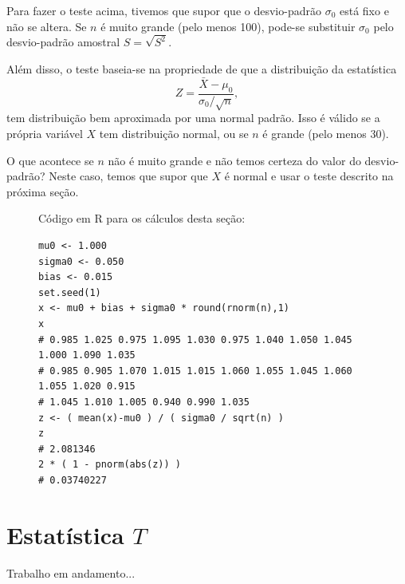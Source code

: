 \documentclass[12pt,a4paper]{article}
\theoremstyle{plain}
\theoremstyle{definition}
\theoremstyle{remark}
\begin{document}
Para fazer o teste acima, tivemos que supor que o desvio-padrão $\sigma_0$ está fixo e não se altera.
Se $n$ é muito grande (pelo menos 100), pode-se substituir $\sigma_0$ pelo desvio-padrão amostral $S = \sqrt{S^2}$.

Além disso, o teste baseia-se na propriedade de que a distribuição da estatística
\[
Z = \frac{\bar X - \mu_0}{\sigma_0 / \sqrt{n}}
,
\]
tem distribuição bem aproximada por uma normal padrão.
Isso é válido se a própria variável $X$ tem distribuição normal, ou se $n$ é grande (pelo menos 30).

O que acontece se $n$ não é muito grande e não temos certeza do valor do desvio-padrão?
Neste caso, temos que supor que $X$ é normal e usar o teste descrito na próxima seção.

\begin{figure}[H]
Código em R para os cálculos desta seção:
\footnotesize
\begin{verbatim}
mu0 <- 1.000
sigma0 <- 0.050
bias <- 0.015
set.seed(1)
x <- mu0 + bias + sigma0 * round(rnorm(n),1)
x
# 0.985 1.025 0.975 1.095 1.030 0.975 1.040 1.050 1.045 1.000 1.090 1.035
# 0.985 0.905 1.070 1.015 1.015 1.060 1.055 1.045 1.060 1.055 1.020 0.915
# 1.045 1.010 1.005 0.940 0.990 1.035
z <- ( mean(x)-mu0 ) / ( sigma0 / sqrt(n) )
z
# 2.081346
2 * ( 1 - pnorm(abs(z)) )
# 0.03740227
\end{verbatim}
\end{figure}


\section{Estatística $T$}

Trabalho em andamento...
\end{document}
